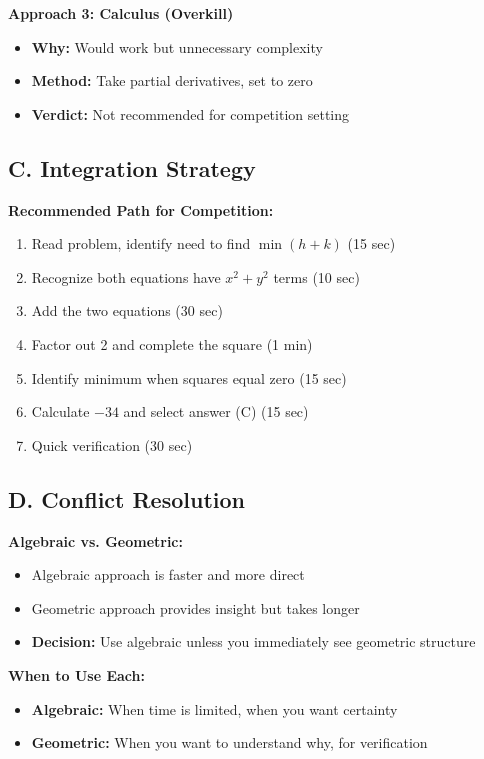 \documentclass[12pt]{article}
\begin{document}
\begin{techniquesbox}
\textbf{Approach 3: Calculus (Overkill)}
\begin{itemize}
    \item \textbf{Why:} Would work but unnecessary complexity
    \item \textbf{Method:} Take partial derivatives, set to zero
    \item \textbf{Verdict:} Not recommended for competition setting
\end{itemize}

\subsection*{C. Integration Strategy}

\textbf{Recommended Path for Competition:}
\begin{enumerate}
    \item Read problem, identify need to find $\min(h + k)$ (15 sec)
    \item Recognize both equations have $x^2 + y^2$ terms (10 sec)
    \item Add the two equations (30 sec)
    \item Factor out 2 and complete the square (1 min)
    \item Identify minimum when squares equal zero (15 sec)
    \item Calculate $-34$ and select answer (C) (15 sec)
    \item Quick verification (30 sec)
\end{enumerate}

\subsection*{D. Conflict Resolution}

\textbf{Algebraic vs. Geometric:}
\begin{itemize}
    \item Algebraic approach is faster and more direct
    \item Geometric approach provides insight but takes longer
    \item \textbf{Decision:} Use algebraic unless you immediately see geometric structure
\end{itemize}

\textbf{When to Use Each:}
\begin{itemize}
    \item \textbf{Algebraic:} When time is limited, when you want certainty
    \item \textbf{Geometric:} When you want to understand why, for verification
\end{itemize}
\end{techniquesbox}
\end{document}
